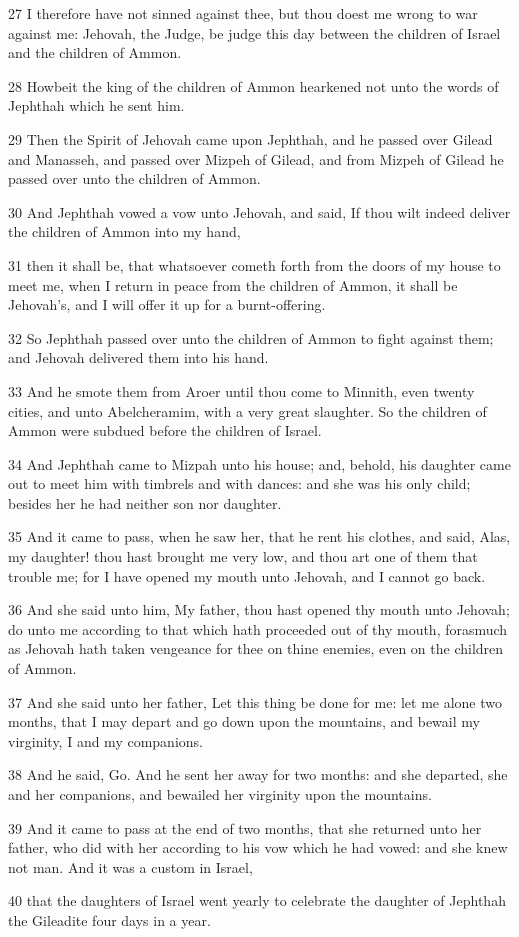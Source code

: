 \par 27 I therefore have not sinned against thee, but thou doest me wrong to war against me: Jehovah, the Judge, be judge this day between the children of Israel and the children of Ammon.
\par 28 Howbeit the king of the children of Ammon hearkened not unto the words of Jephthah which he sent him.
\par 29 Then the Spirit of Jehovah came upon Jephthah, and he passed over Gilead and Manasseh, and passed over Mizpeh of Gilead, and from Mizpeh of Gilead he passed over unto the children of Ammon.
\par 30 And Jephthah vowed a vow unto Jehovah, and said, If thou wilt indeed deliver the children of Ammon into my hand,
\par 31 then it shall be, that whatsoever cometh forth from the doors of my house to meet me, when I return in peace from the children of Ammon, it shall be Jehovah's, and I will offer it up for a burnt-offering.
\par 32 So Jephthah passed over unto the children of Ammon to fight against them; and Jehovah delivered them into his hand.
\par 33 And he smote them from Aroer until thou come to Minnith, even twenty cities, and unto Abelcheramim, with a very great slaughter. So the children of Ammon were subdued before the children of Israel.
\par 34 And Jephthah came to Mizpah unto his house; and, behold, his daughter came out to meet him with timbrels and with dances: and she was his only child; besides her he had neither son nor daughter.
\par 35 And it came to pass, when he saw her, that he rent his clothes, and said, Alas, my daughter! thou hast brought me very low, and thou art one of them that trouble me; for I have opened my mouth unto Jehovah, and I cannot go back.
\par 36 And she said unto him, My father, thou hast opened thy mouth unto Jehovah; do unto me according to that which hath proceeded out of thy mouth, forasmuch as Jehovah hath taken vengeance for thee on thine enemies, even on the children of Ammon.
\par 37 And she said unto her father, Let this thing be done for me: let me alone two months, that I may depart and go down upon the mountains, and bewail my virginity, I and my companions.
\par 38 And he said, Go. And he sent her away for two months: and she departed, she and her companions, and bewailed her virginity upon the mountains.
\par 39 And it came to pass at the end of two months, that she returned unto her father, who did with her according to his vow which he had vowed: and she knew not man. And it was a custom in Israel,
\par 40 that the daughters of Israel went yearly to celebrate the daughter of Jephthah the Gileadite four days in a year.

